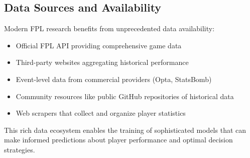 \subsection{Data Sources and Availability}

Modern FPL research benefits from unprecedented data availability:
\begin{itemize}
    \item Official FPL API providing comprehensive game data
    \item Third-party websites aggregating historical performance
    \item Event-level data from commercial providers (Opta, StatsBomb)
    \item Community resources like public GitHub repositories of historical data
    \item Web scrapers that collect and organize player statistics \cite{pappalardo2019, decroos2020}
\end{itemize}

This rich data ecosystem enables the training of sophisticated models that can make informed predictions about player performance and optimal decision strategies.